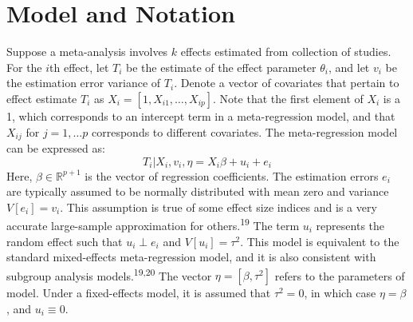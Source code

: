 \documentclass[
]{article}
\begin{document}
\hypertarget{model-and-notation}{%
\section{Model and Notation}\label{model-and-notation}}

Suppose a meta-analysis involves \(k\) effects estimated from collection of studies.
For the \(i\)th effect, let \(T_i\) be the estimate of the effect parameter \(\theta_i\), and let \(v_i\) be the estimation error variance of \(T_i\).
Denote a vector of covariates that pertain to effect estimate \(T_i\) as \(X_i =[1, X_{i1}, \ldots, X_{ip}]\). Note that the first element of \(X_i\) is a 1, which corresponds to an intercept term in a meta-regression model, and that \(X_{ij}\) for \(j = 1, \ldots p\) corresponds to different covariates.
The meta-regression model can be expressed as:
\begin{equation}
T_i | X_i, v_i, \eta = X_i \beta + u_i + e_i 
\label{eq:full-data-reg}
\end{equation}
Here, \(\beta \in \mathbb{R}^{p+1}\) is the vector of regression coefficients.
The estimation errors \(e_i\) are typically assumed to be normally distributed with mean zero and variance \(V[e_i] = v_i\).
This assumption is true of some effect size indices and is a very accurate large-sample approximation for others.\textsuperscript{19}
The term \(u_i\) represents the random effect such that \(u_i \perp e_i\) and \(V[u_i] = \tau^2\).
This model is equivalent to the standard mixed-effects meta-regression model, and it is also consistent with subgroup analysis models.\textsuperscript{19,20}
The vector \(\eta = [\beta, \tau^2]\) refers to the parameters of model.
Under a fixed-effects model, it is assumed that \(\tau^2 = 0\), in which case \(\eta = \beta\), and \(u_i \equiv 0\).
\end{document}

